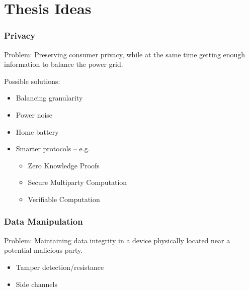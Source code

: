 
\section{Thesis Ideas}

\begin{frame}
  \frametitle{Privacy}

  Problem: Preserving consumer privacy, while at the same time getting enough information to balance the power grid.

  Possible solutions:
  \begin{itemize}
    \item Balancing granularity
    \item Power noise
    \item Home battery
    \item Smarter protocols -- e.g.
    \begin{itemize}
      \item Zero Knowledge Proofs
      \item Secure Multiparty Computation
      \item Verifiable Computation
    \end{itemize}
  \end{itemize}
\end{frame}

\begin{frame}
  \frametitle{Data Manipulation}

  Problem: Maintaining data integrity in a device physically located near a potential malicious party.

  \begin{itemize}
    \item Tamper detection/resistance
    \item Side channels
  \end{itemize}
\end{frame}
